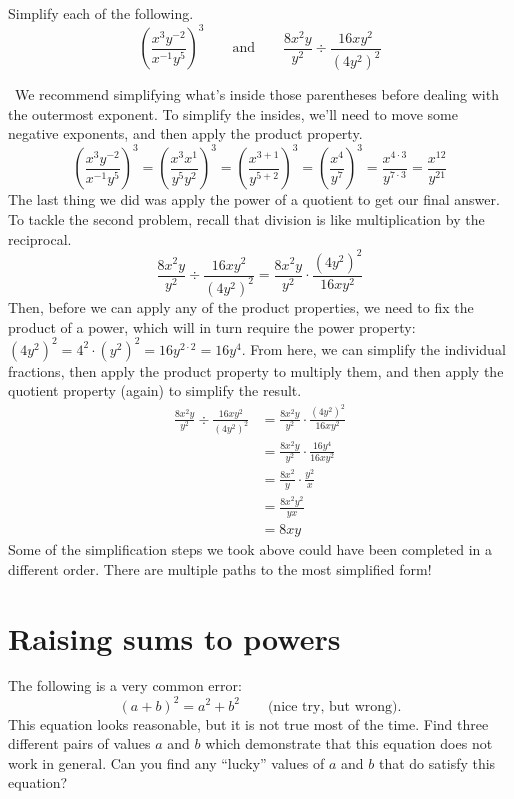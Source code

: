 \begin{boxedex}
Simplify each of the following.
\[\left(\frac{x^3y^{-2}}{x^{-1}y^5}\right)^3 \qquad\text{and}\qquad \frac{8x^2y}{y^2}\div\frac{16xy^2}{(4y^2)^2}\]

\exsoln\ We recommend simplifying what's inside those parentheses before dealing with the outermost exponent. To simplify the insides, we'll need to move some negative exponents, and then apply the product property.
\[\left(\frac{x^3y^{-2}}{x^{-1}y^5}\right)^3
= \left(\frac{x^3x^{1}}{y^5y^2}\right)^3
= \left(\frac{x^{3+1}}{y^{5+2}}\right)^3
= \left(\frac{x^4}{y^7}\right)^3
= \frac{x^{4\cdot3}}{y^{7\cdot3}}
= \frac{x^{12}}{y^{21}}
\]
The last thing we did was apply the power of a quotient to get our final answer. To tackle the second problem, recall that division is like multiplication by the reciprocal. 
\[\frac{8x^2y}{y^2}\div\frac{16xy^2}{(4y^2)^2} = \frac{8x^2y}{y^2}\cdot\frac{(4y^2)^2}{16xy^2}\]
Then, before we can apply any of the product properties, we need to fix the product of a power, which will in turn require the power property: $(4y^2)^2 = 4^2 \cdot (y^2)^2 = 16 y^{2\cdot2} = 16y^4$. From here, we can simplify the individual fractions, then apply the product property to multiply them, and then apply the quotient property (again) to simplify the result.
\[\begin{aligned}
\frac{8x^2y}{y^2}\div\frac{16xy^2}{(4y^2)^2}
&= \frac{8x^2y}{y^2}\cdot\frac{(4y^2)^2}{16xy^2}
\\[1ex]&= \frac{8x^2y}{y^2}\cdot\frac{16y^4}{16xy^2}
\\[1ex]&= \frac{8x^2}{y}\cdot\frac{y^2}{x}
\\[1ex]&= \frac{8x^2y^2}{yx}
\\[1ex]&= 8xy
\end{aligned}\]
Some of the simplification steps we took above could have been completed in a different order. There are multiple paths to the most simplified form!
\end{boxedex}


\section{Raising sums to powers}
\label{sec:exposumstopowers}

\begin{boxedexplore}
The following is a very common error: \[(a+b)^2 = a^2 + b^2 \qquad\text{(nice try, but wrong)}.\] This equation looks reasonable, but it is not true most of the time. Find three different pairs of values $a$ and $b$ which demonstrate that this equation does not work in general. Can you find any ``lucky'' values of $a$ and $b$ that do satisfy this equation?
\end{boxedexplore}

